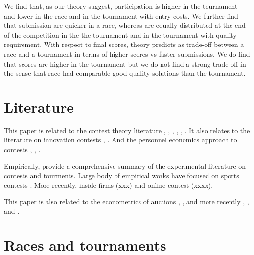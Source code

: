 \documentclass[12pt, titlepage, draft]{article} \usepackage[utf8]{inputenc}                           \usepackage[english]{babel}                           \usepackage{amsmath,amssymb,amsfonts}                 \usepackage{xcolor,tikz,graphicx,subfig}              \usepackage{rotating,multirow,array,dcolumn,booktabs} \usepackage{natbib}                                   
\begin{document}
We find that, as our theory suggest, participation is higher in the
tournament and lower in the race and in the tournament with entry costs.
We further find that submission are quicker in a race, whereas are
equally distributed at the end of the competition in the the tournament
and in the tournament with quality requirement. With respect to final
scores, theory predicts as trade-off between a race and a tournament in
terms of higher scores vs faster submissions. We do find that scores are
higher in the tournament but we do not find a strong trade-off in the
sense that race had comparable good quality solutions than the
tournament.

\section{Literature}\label{literature}

This paper is related to the contest theory literature
\citet{dixit1987strategic} \citet{baye2003strategic},
\citet{parreiras2010contests}, \citet{moldovanu2001optimal},
\citet{moldovanu2006contest}, \citet{siegel2009all},
\citet{siegel2014contests}. It also relates to the literature on
innovation contests \citet{taylor1995digging}, \citet{che2003optimal}.
And the personnel economics approach to contests \citet{lazear1981rank},
\citet{green1983comparison}, \citet{mary1984economic}.

Empirically, \citet{dechenaux2014survey} provide a comprehensive summary
of the experimental literature on contests and tourments. Large body of
empirical works have focused on sports contests
\citet{szymanski2003economic}. More recently, inside firms (xxx) and
online contest (xxxx).

This paper is also related to the econometrics of auctions
\citet{paarsch1992deciding}, \citet{laffont1995econometrics},
\citet{donald1996identification} and more recently
\citet{athey2011comparing}, \citet{athey2002identification}, and
\citet{athey2007nonparametric}.
 \section{Races and tournaments}\label{races-and-tournaments}

\newcommand{\note}[1]{\textcolor{red}{[#1]}} \newcommand\ability{a_i}
\newcommand\marginaltype{\underline a}
\newcommand\cscore{c_{y}}                   \newcommand\ctime{c_{t}}
\newcommand\dord[2][X]{f_{#1_{#2:n}}}  \newcommand\pord[2][X]{F_{#1_{#2:n}}}
\newcommand\bidscore{y^*}                   \newcommand\bidtime{t^*}
\newcommand\invertb{b^{-1}}
\newcommand\lowercost{\underline{c}}        \newcommand\uppercost{\bar{c}}
\newcommand\deadline{d}
\newcommand\tweight{\tau}
\newcommand\target{\bar y}
\newcommand\entrylimit{\bar\theta}
\newcommand{\Expect}{{\bf E}}      \newcommand\realsp{\mathbb{R}^{+}}
\end{document}
